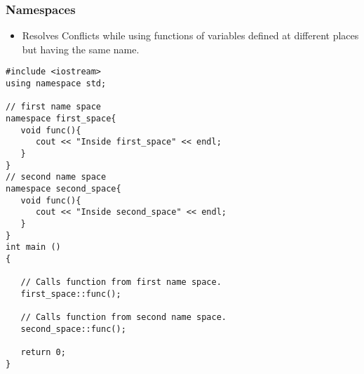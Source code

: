 \documentclass{beamer}
\newtheorem{Key points}{Key points}
\newcommand\Fontvi{\fontsize{5}{6.2}\selectfont}
\begin{document}
\begin{frame}[fragile]
\frametitle{Namespaces}
\begin{itemize}
\item Resolves Conflicts while using functions of variables defined at different places but having the same name.
\end{itemize}
\Fontvi
\begin{lstlisting}
#include <iostream>
using namespace std;

// first name space
namespace first_space{
   void func(){
      cout << "Inside first_space" << endl;
   }
}
// second name space
namespace second_space{
   void func(){
      cout << "Inside second_space" << endl;
   }
}
int main ()
{
 
   // Calls function from first name space.
   first_space::func();
   
   // Calls function from second name space.
   second_space::func(); 

   return 0;
}
\end{lstlisting}
\end{frame}
\end{document}
